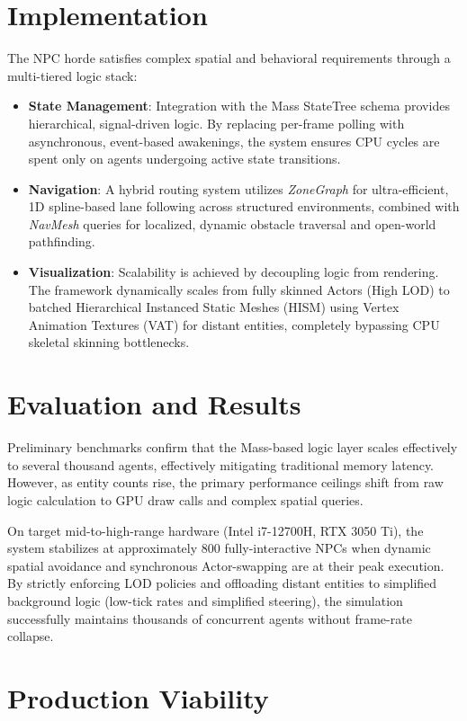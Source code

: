 \documentclass[%
    a4paper, %
    corpo=12pt, %
    oneside, %
    stile=standard,
    tipotesi=magistrale,
    numerazioneromana, %
    openright, %
    cucitura=7mm, %
]{toptesi}
\begin{document}
\section{Implementation}

The NPC horde satisfies complex spatial and behavioral requirements through a multi-tiered logic stack:
\begin{itemize}
    \item \textbf{State Management}: Integration with the Mass StateTree schema provides hierarchical, signal-driven logic. By replacing per-frame polling with asynchronous, event-based awakenings, the system ensures CPU cycles are spent only on agents undergoing active state transitions.
    \item \textbf{Navigation}: A hybrid routing system utilizes \textit{ZoneGraph} for ultra-efficient, 1D spline-based lane following across structured environments, combined with \textit{NavMesh} queries for localized, dynamic obstacle traversal and open-world pathfinding.
    \item \textbf{Visualization}: Scalability is achieved by decoupling logic from rendering. The framework dynamically scales from fully skinned Actors (High LOD) to batched Hierarchical Instanced Static Meshes (HISM) using Vertex Animation Textures (VAT) for distant entities, completely bypassing CPU skeletal skinning bottlenecks.
\end{itemize}

\section{Evaluation and Results}

Preliminary benchmarks confirm that the Mass-based logic layer scales effectively to several thousand agents, effectively mitigating traditional memory latency. However, as entity counts rise, the primary performance ceilings shift from raw logic calculation to GPU draw calls and complex spatial queries.

On target mid-to-high-range hardware (Intel i7-12700H, RTX 3050 Ti), the system stabilizes at approximately 800 fully-interactive NPCs when dynamic spatial avoidance and synchronous Actor-swapping are at their peak execution. By strictly enforcing LOD policies and offloading distant entities to simplified background logic (low-tick rates and simplified steering), the simulation successfully maintains thousands of concurrent agents without frame-rate collapse.

\section{Production Viability}
\end{document}

